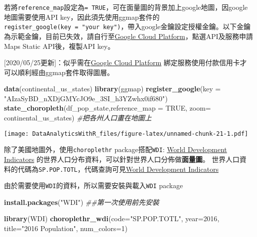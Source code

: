 \documentclass[
]{book}
\newenvironment{Shaded}{\begin{snugshade}}{\end{snugshade}}
\newcommand{\CommentTok}[1]{\textcolor[rgb]{0.56,0.35,0.01}{\textit{#1}}}
\newcommand{\DataTypeTok}[1]{\textcolor[rgb]{0.13,0.29,0.53}{#1}}
\newcommand{\DecValTok}[1]{\textcolor[rgb]{0.00,0.00,0.81}{#1}}
\newcommand{\KeywordTok}[1]{\textcolor[rgb]{0.13,0.29,0.53}{\textbf{#1}}}
\newcommand{\NormalTok}[1]{#1}
\newcommand{\OtherTok}[1]{\textcolor[rgb]{0.56,0.35,0.01}{#1}}
\newcommand{\StringTok}[1]{\textcolor[rgb]{0.31,0.60,0.02}{#1}}
\begin{document}
若將\texttt{reference\_map}設定為\texttt{=\ TRUE}，可在面量圖的背景加上google地圖，因google地圖需要使用API key，因此須先使用ggmap套件的\texttt{register\_google(key\ =\ "your\ key")}，帶入google金鑰設定授權金鑰。以下金鑰為示範金鑰，目前已失效，請自行至\href{https://console.cloud.google.com/}{Google Cloud Platform}，點選API及服務申請Maps Static API後，複製API key。

{[}2020/05/25更新{]}：似乎需在\href{https://console.cloud.google.com/}{Google Cloud Platform} 綁定服務使用付款信用卡才可以順利經由ggmap套件取得圖層。

\begin{Shaded}
\begin{Highlighting}[]
\KeywordTok{data}\NormalTok{(continental_us_states)}
\KeywordTok{library}\NormalTok{(ggmap)}
\KeywordTok{register_google}\NormalTok{(}\DataTypeTok{key =} \StringTok{"AIzaSyBD_nXDjGMYcJO9e_3SI_h3YZwhx0if680"}\NormalTok{)}
\KeywordTok{state_choropleth}\NormalTok{(df_pop_state,}\DataTypeTok{reference_map =} \OtherTok{TRUE}\NormalTok{,}
                 \DataTypeTok{zoom=}\NormalTok{ continental_us_states) }\CommentTok{#把各州人口畫在地圖上}
\end{Highlighting}
\end{Shaded}

\texttt{[image: DataAnalyticsWithR\_files/figure-latex/unnamed-chunk-21-1.pdf]}

除了美國地圖外，使用\texttt{choroplethr} package搭配\texttt{WDI}: \href{http://beta.data.worldbank.org/}{World Development Indicators} 的世界人口分布資料，可以針對世界人口分佈做\textbf{面量圖}。
世界人口資料的代碼為\texttt{SP.POP.TOTL}，代碼查詢可見\href{http://beta.data.worldbank.org/}{World Development Indicators}

由於需要使用\texttt{WDI}的資料，所以需要安裝與載入\texttt{WDI}\citep{R-WDI} package

\begin{Shaded}
\begin{Highlighting}[]
\KeywordTok{install.packages}\NormalTok{(}\StringTok{"WDI"}\NormalTok{) }\CommentTok{##第一次使用前先安裝}
\end{Highlighting}
\end{Shaded}

\begin{Shaded}
\begin{Highlighting}[]
\KeywordTok{library}\NormalTok{(WDI)}
\KeywordTok{choroplethr_wdi}\NormalTok{(}\DataTypeTok{code=}\StringTok{"SP.POP.TOTL"}\NormalTok{, }\DataTypeTok{year=}\DecValTok{2016}\NormalTok{, }
                \DataTypeTok{title=}\StringTok{"2016 Population"}\NormalTok{, }\DataTypeTok{num_colors=}\DecValTok{1}\NormalTok{)}
\end{Highlighting}
\end{Shaded}
\end{document}
